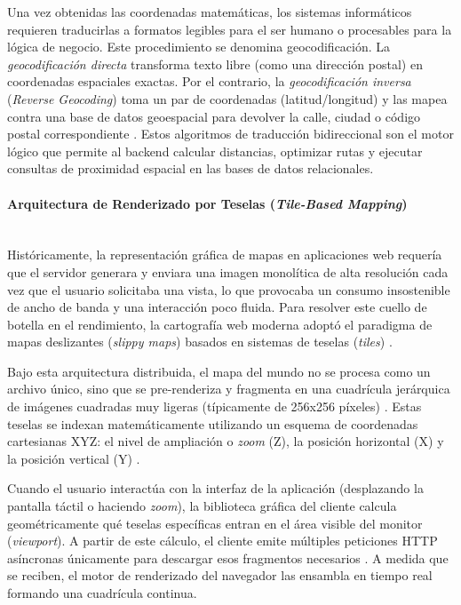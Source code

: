 Una vez obtenidas las coordenadas matemáticas, los sistemas informáticos requieren traducirlas a formatos legibles para el ser humano o procesables para la lógica de negocio. Este procedimiento se denomina geocodificación. La \textit{geocodificación directa} transforma texto libre (como una dirección postal) en coordenadas espaciales exactas. Por el contrario, la \textit{geocodificación inversa} (\textit{Reverse Geocoding}) toma un par de coordenadas (latitud/longitud) y las mapea contra una base de datos geoespacial para devolver la calle, ciudad o código postal correspondiente \cite{fu_webgis_2010}. Estos algoritmos de traducción bidireccional son el motor lógico que permite al backend calcular distancias, optimizar rutas y ejecutar consultas de proximidad espacial en las bases de datos relacionales.

\paragraph{Arquitectura de Renderizado por Teselas (\textit{Tile-Based Mapping})} \leavevmode \\

Históricamente, la representación gráfica de mapas en aplicaciones web requería que el servidor generara y enviara una imagen monolítica de alta resolución cada vez que el usuario solicitaba una vista, lo que provocaba un consumo insostenible de ancho de banda y una interacción poco fluida. Para resolver este cuello de botella en el rendimiento, la cartografía web moderna adoptó el paradigma de mapas deslizantes (\textit{slippy maps}) basados en sistemas de teselas (\textit{tiles}) \cite{sample_tile_2010}.

Bajo esta arquitectura distribuida, el mapa del mundo no se procesa como un archivo único, sino que se pre-renderiza y fragmenta en una cuadrícula jerárquica de imágenes cuadradas muy ligeras (típicamente de 256x256 píxeles) \cite{sample_tile_2010}. Estas teselas se indexan matemáticamente utilizando un esquema de coordenadas cartesianas XYZ: el nivel de ampliación o \textit{zoom} (Z), la posición horizontal (X) y la posición vertical (Y) \cite{sample_tile_2010}.

Cuando el usuario interactúa con la interfaz de la aplicación (desplazando la pantalla táctil o haciendo \textit{zoom}), la biblioteca gráfica del cliente calcula geométricamente qué teselas específicas entran en el área visible del monitor (\textit{viewport}). A partir de este cálculo, el cliente emite múltiples peticiones HTTP asíncronas únicamente para descargar esos fragmentos necesarios \cite{fu_webgis_2010}. A medida que se reciben, el motor de renderizado del navegador las ensambla en tiempo real formando una cuadrícula continua. 

